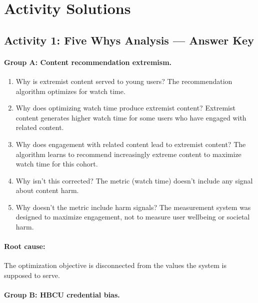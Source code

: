 \section{Activity Solutions}

\subsection{Activity 1: Five Whys Analysis --- Answer Key}

\paragraph{Group A: Content recommendation extremism.}

\begin{enumerate}
    \item Why is extremist content served to young users? The recommendation algorithm optimizes for watch time.
    \item Why does optimizing watch time produce extremist content? Extremist content generates higher watch time for some users who have engaged with related content.
    \item Why does engagement with related content lead to extremist content? The algorithm learns to recommend increasingly extreme content to maximize watch time for this cohort.
    \item Why isn't this corrected? The metric (watch time) doesn't include any signal about content harm.
    \item Why doesn't the metric include harm signals? The measurement system was designed to maximize engagement, not to measure user wellbeing or societal harm.
\end{enumerate}

\paragraph{Root cause:} The optimization objective is disconnected from the values the system is supposed to serve.

\paragraph{Group B: HBCU credential bias.}

